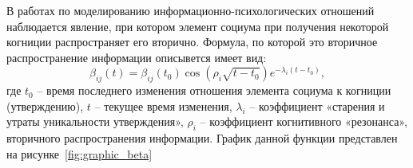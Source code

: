 В работах по моделированию информационно-психологических отношений наблюдается явление, при котором
элемент социума при получения некоторой когниции распространяет его вторично.
Формула, по которой это вторичное распространение информации описывется имеет вид:
\begin{equation}\label{beta_ij}
    \beta_{ij}(t) = \beta_{ij}(t_0)\cos(\rho_{i}\sqrt{t-t_0})e^{-\lambda_{i}(t-t_0)},
\end{equation}
где $t_0$ – время последнего изменения отношения элемента социума к когниции (утверждению), $t$ – текущее
время изменения, $\lambda_{i}$ – коэффициент «старения и утраты уникальности утверждения», $\rho_{i}$ –
коэффициент когнитивного «резонанса», вторичного распространения информации.
График данной функции представлен на рисунке~\ref{fig:graphic_beta}
\begin{figure}[h!]
    \captionsetup{justification=centering}
    \begin{minipage}[h]{0.4\linewidth}
    \end{minipage}
    \hfill
    \begin{minipage}[h]{0.4\linewidth}

\end{minipage}
\end{figure}
